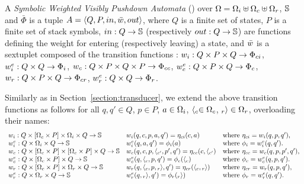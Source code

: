 \begin{definition}
A \emph{Symbolic Weighted Visibly Pushdown Automata} (\SWVPA) 
over  $\Omega = \Omegai \uplus \Omegac \uplus \Omegar$, $\mathbb{S}$ and $\bar\Phi$ 
is a tuple $A = \< Q, P, \init, \bar\wei, \final >$,
where $Q$ is a finite set of states, 
$P$ is a finite set of stack symbols, 
$\mathsf{in} : Q \to \Semiring$ 
(respectively $\mathsf{out} : Q \to \Semiring$)
are functions defining the weight for entering
(respectively leaving) a state, 
and $\bar\wei$ is a sextuplet composed of the transition functions :
$\weii : Q \times P \times Q \to \Phici$,  
$\weiei : Q \times Q \to \Phii$,  
$\weic : Q \times P \times Q \times P \to \Phicc$,  
$\weiec : Q \times P \times Q \to \Phic$,  
$\weir : Q \times P \times Q \to \Phicr$,  
$\weier : Q \times Q \to \Phir$.
\end{definition}
%
Similarly as in Section~\ref{section:transducer}, 
we extend the above transition functions as follows
for all $q, q' \in Q$, $p \in P$, 
$a \in \Omegai$, 
$\call{c} \in \Omegac$, 
$\return{r} \in \Omegar$, 
overloading their names: %
\[
\begin{array}{lll}
\weii: Q \times [\Omegac \times P] \times \Omegai \times Q \to \Semiring & 
\weii(q, c, p, a, q') = \eta_\mathsf{ci}(c, a) & 
\mathrm{where~} \eta_\mathsf{ci} = \weii(q, p, q'),\\
%
\weiei: Q \times \Omegai \times Q \to \Semiring & 
\weiei(q, a, q') = \phi_\mathsf{i}(a) &
\mathrm{where~} \phi_\mathsf{i} = \weiei(q, q').\\
%
\weic: Q \times [\Omegac \times P] \times  [\Omegac \times P] \times Q \to \Semiring & 
\weic(q, c, p, \call{c'}, p', q') = \eta_\mathsf{cc}(c, \call{c'}) & 
\mathrm{where~} \eta_\mathsf{cc} = \weic(q, p, p', q'),\\
%
\weiec: Q \times [\Omegac \times P] \times Q \to \Semiring & 
\weiec(q, {\call{c}}, p, q') = \phi_\mathsf{c}({\call{c}}) &
\mathrm{where~} \phi_\mathsf{c} = \weiec(q, p, q').\\
%
\weir: Q \times [\Omegac \times P] \times \Omegar \times Q \to \Semiring & 
\weir(q, {\call{c}},  p, {\return{r}}, q') = \eta_\mathsf{cr}({\call{c}},  {\return{r}}) & 
\mathrm{where~} \eta_\mathsf{cr} = \weir(q, p, q'),\\
%
\weier: Q \times \Omegar \times Q \to \Semiring & 
\weier(q, {\return{r}}, q') = \phi_\mathsf{r}({\return{r}}) &
\mathrm{where~} \phi_\mathsf{r} = \weier(q, q').\\
\end{array}      
\]

